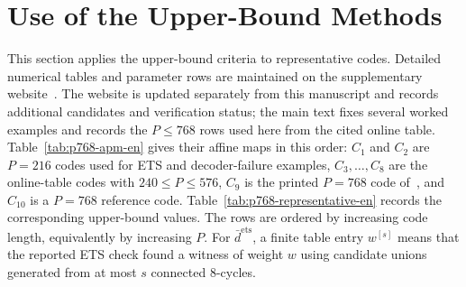 \documentclass[11pt]{article}
\newcommand{\dbound}[1]{\ensuremath{\bar{d}^{\mathrm{#1}}}}
\newcommand{\dets}{\dbound{ets}}
\theoremstyle{uprightthm}
\begin{document}
\section{Use of the Upper-Bound Methods}
\label{sec:results-en}
This section applies the upper-bound criteria to representative codes.
Detailed numerical tables and parameter rows are maintained on the supplementary
website~\cite{KasaiWeb2026}.  The website is updated separately from this
manuscript and records additional candidates and verification status; the main
text fixes several worked examples and records the $P\le 768$ rows used here
from the cited online table.
Table~\ref{tab:p768-apm-en} gives their affine maps in this order:
$C_1$ and $C_2$ are $P=216$ codes used for ETS and decoder-failure examples,
$C_3,\ldots,C_8$ are the online-table codes with $240\le P\le 576$,
$C_9$ is the printed $P=768$ code of~\cite{Kasai2026}, and
$C_{10}$ is a $P=768$ reference code.
Table~\ref{tab:p768-representative-en} records the corresponding upper-bound values.
The rows are ordered by increasing code length, equivalently by increasing $P$.
For \dets, a finite table entry \(w^{[s]}\) means that the reported ETS check
found a witness of weight \(w\) using candidate unions generated from at most
\(s\) connected \(8\)-cycles.
\end{document}
